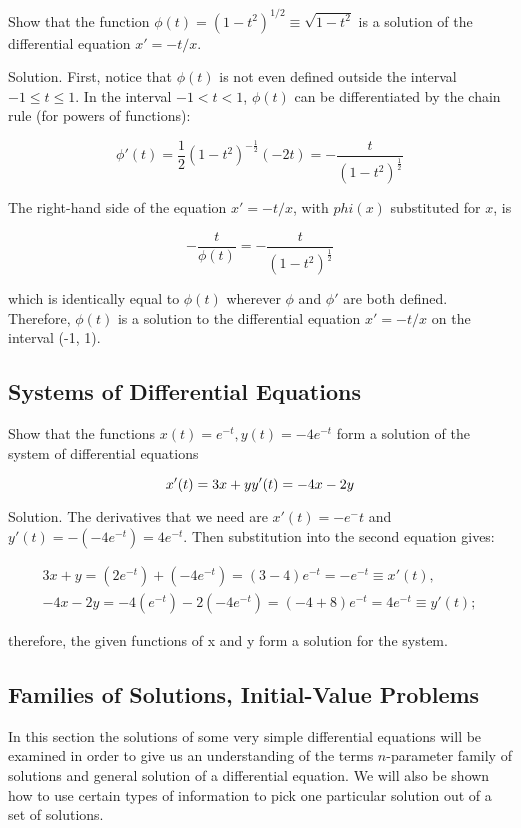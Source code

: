     \begin{problem}
      Show that the function $\phi(t)=(1-t^2)^{1/2}\equiv\sqrt{1-t^2}$ is a solution of the differential equation $x'=-t/x$.

      Solution. First, notice that $\phi(t)$ is not even defined outside the interval $-1\le t\le 1$. In the interval $-1<t<1$, $\phi(t)$ can be differentiated by the chain rule (for powers of functions):

      \[
        \phi'(t) =\frac{1}{2}(1 - t^2)^{ - \frac{1}{2}}( - 2t) =- \frac{t}{(1 - t^2)^{\frac{1}{2}}}
      \]

      The right-hand side of the equation $x'=-t/x$, with $phi(x)$ substituted for $x$, is 

      \[
        - \frac{t}{\phi (t)} =- \frac{t}{(1 - t^2)^{\frac{1}{2}}}
      \]

      which is identically equal to $\phi(t)$ wherever $\phi$ and $\phi'$ are both defined. Therefore, $\phi(t)$ is a solution to the differential equation $x'=-t/x$ on the interval (-1, 1).
    \end{problem}

\subsection{Systems of Differential Equations}

  \begin{problem}
    Show that the functions $x(t)=e^{-t},y(t)=-4e^{-t}$ form a solution of the system of differential equations

    \[
      x'(t) = 3x + y\newline
      y'(t) =- 4x - 2y
    \]

    Solution. The derivatives that we need are $x'(t)=-e^-t$ and $y'(t)=-(-4e^{-t})=4e^{-t}$. Then substitution into the second equation gives:

    \begin{align*}
      3x+y=(2e^{-t})+(-4e^{-t})=(3-4)e^{-t}=-e^{-t}\equiv x'(t),\\
      -4x-2y=-4(e^{-t})-2(-4e^{-t})=(-4+8)e^{-t}=4e^{-t}\equiv y'(t);
    \end{align*}

    therefore, the given functions of x and y form a solution for the system.
  \end{problem}

\subsection{Families of Solutions, Initial-Value Problems}
  In this section the solutions of some very simple differential equations will be examined in order to give us an understanding of the terms $n$-parameter family of solutions and general solution of a differential equation. We will also be shown how to use certain types of information to pick one particular solution out of a set of solutions.


